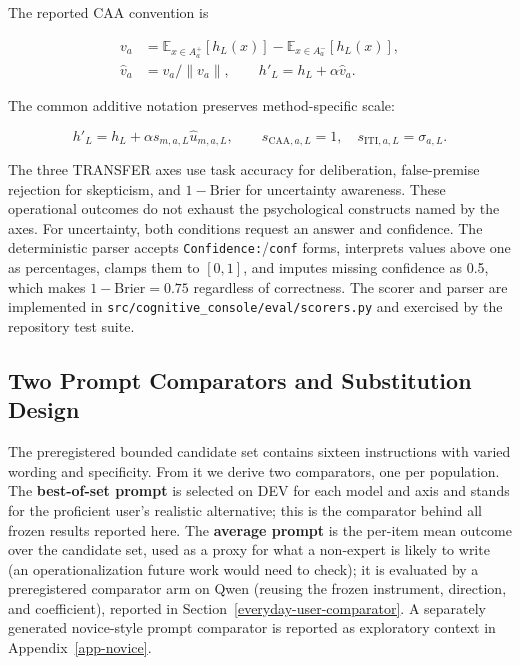 \documentclass[manuscript,review,anonymous]{acmart}
\begin{document}
The reported CAA convention is

\begin{equation}
\begin{aligned}
v_a &= \mathbb{E}_{x\in A_a^+}[h_L(x)]-\mathbb{E}_{x\in A_a^-}[h_L(x)],\\
\hat v_a &= v_a/\lVert v_a\rVert, \qquad h'_L=h_L+\alpha\hat v_a.
\end{aligned}
\label{eq:caa-steering}
\end{equation}

The common additive notation preserves method-specific scale:

\begin{equation}
h'_L=h_L+\alpha s_{m,a,L}\hat u_{m,a,L},\qquad
s_{\mathrm{CAA},a,L}=1,\quad s_{\mathrm{ITI},a,L}=\sigma_{a,L}.
\label{eq:method-scaling}
\end{equation}


The three TRANSFER axes use task accuracy for deliberation, false-premise rejection for skepticism, and \(1-\mathrm{Brier}\) for uncertainty awareness. {}%
These operational outcomes do not exhaust the psychological constructs named by the axes. For uncertainty, both conditions request an answer and confidence. The deterministic parser accepts \texttt{Confidence:}/\texttt{conf} forms, interprets values above one as percentages, clamps them to \([0,1]\), and imputes missing confidence as 0.5, which makes \(1-\mathrm{Brier}=0.75\) regardless of correctness. {}%
{}%
The scorer and parser are implemented in \texttt{src/cognitive\_console/eval/scorers.py} and exercised by the repository test suite.

\subsection{Two Prompt Comparators and Substitution Design}\label{two-prompt-comparators-and-substitution-design}

The preregistered bounded candidate set contains sixteen instructions with varied wording and specificity. From it we derive two comparators, one per population. The \textbf{best-of-set prompt} is selected on DEV for each model and axis and stands for the proficient user's realistic alternative; this is the comparator behind all frozen results reported here. {}%
{}%
The \textbf{average prompt} is the per-item mean outcome over the candidate set, used as a proxy for what a non-expert is likely to write (an operationalization future work would need to check); it is evaluated by a preregistered comparator arm on Qwen (reusing the frozen instrument, direction, and coefficient), reported in Section~\ref{everyday-user-comparator}. A separately generated novice-style prompt comparator is reported as exploratory context in Appendix~\ref{app-novice}.
\end{document}
